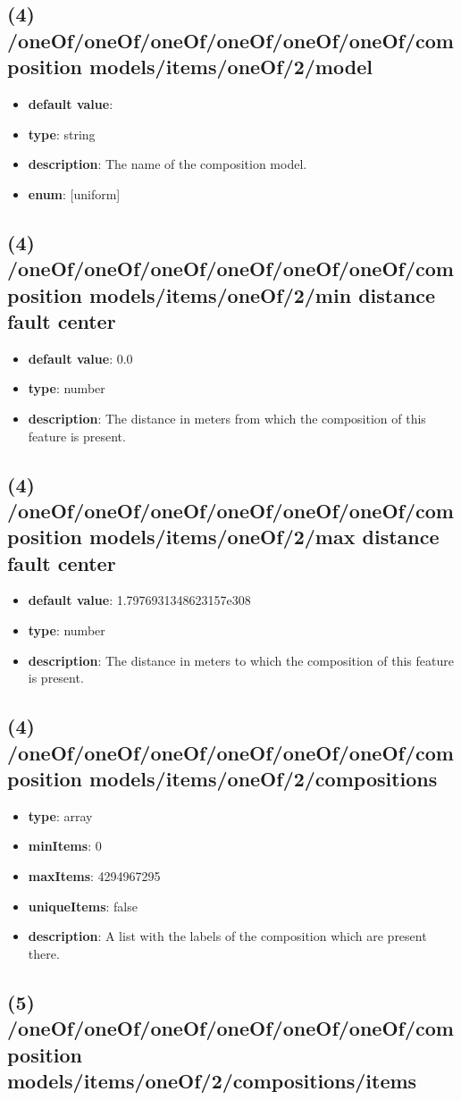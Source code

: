 \subsection{(4) /oneOf/oneOf/oneOf/oneOf/oneOf/oneOf/composition models/items/oneOf/2/model}
\begin{itemize}[leftmargin=4em]\item {\bf default value}: 
\item {\bf type}: string
\item {\bf description}: The name of the composition model.
\item {\bf enum}: [uniform]\end{itemize}\subsection{(4) /oneOf/oneOf/oneOf/oneOf/oneOf/oneOf/composition models/items/oneOf/2/min distance fault center}
\begin{itemize}[leftmargin=4em]\item {\bf default value}: 0.0
\item {\bf type}: number
\item {\bf description}: The distance in meters from which the composition of this feature is present.
\end{itemize}\subsection{(4) /oneOf/oneOf/oneOf/oneOf/oneOf/oneOf/composition models/items/oneOf/2/max distance fault center}
\begin{itemize}[leftmargin=4em]\item {\bf default value}: 1.7976931348623157e308
\item {\bf type}: number
\item {\bf description}: The distance in meters to which the composition of this feature is present.
\end{itemize}\subsection{(4) /oneOf/oneOf/oneOf/oneOf/oneOf/oneOf/composition models/items/oneOf/2/compositions}
\begin{itemize}[leftmargin=4em]\item {\bf type}: array
\item {\bf minItems}: 0
\item {\bf maxItems}: 4294967295
\item {\bf uniqueItems}: false
\item {\bf description}: A list with the labels of the composition which are present there.
\end{itemize}\subsection{(5) /oneOf/oneOf/oneOf/oneOf/oneOf/oneOf/composition models/items/oneOf/2/compositions/items}

